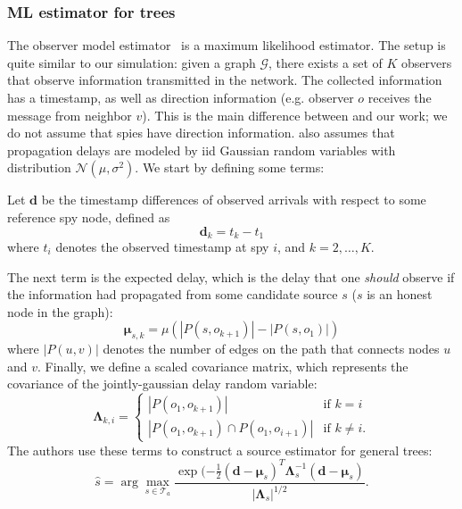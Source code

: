 \subsubsection{ML estimator for trees}
The observer model estimator~\cite{pinto} is a maximum likelihood estimator. The setup is quite similar to our simulation: given a graph $\mathcal G$, there exists a set of $K$ observers that observe information transmitted in the network. The collected information has a timestamp, as well as direction information (e.g. observer $o$ receives the message from neighbor $v$). This is the main difference between \cite{pinto} and our work; we do not assume that spies have direction information. \cite{pinto} also assumes that propagation delays are modeled by iid Gaussian random variables with distribution $\mathcal N(\mu,\sigma^2)$. We start by defining some terms:

Let $\boldsymbol{d}$ be the timestamp differences of observed arrivals with respect to some reference spy node, defined as
\begin{equation}
  \boldsymbol{d}_k = t_{k} - t_1
\end{equation}
where $t_i$ denotes the observed timestamp at spy $i$, and $k = 2,\ldots, K$.

The next term is the expected delay, which is the delay that one \emph{should} observe if the information had propagated from some candidate source $s$ ($s$ is an honest node in the graph):
\begin{equation}
  \boldsymbol{\mu}_{s,k} = \mu (|P(s, o_{k+1})| - |P(s, o_1)|)
\end{equation}
where $|P(u, v)|$ denotes the number of edges on the path that connects nodes $u$ and $v$. Finally, we define a scaled covariance matrix, which represents the covariance of the jointly-gaussian delay random variable:
\begin{equation}
  \boldsymbol{\Lambda}_{k, i} = \begin{cases}
    |P(o_1, o_{k+1})| & \text{if $k = i$} \\
    |P(o_1, o_{k+1}) \cap P(o_1, o_{i+1})| & \text{if $k \neq i$}.
  \end{cases}
\end{equation}
The authors use these terms to construct a source estimator for general trees:
\begin{equation}
\label{eq:general}
\hat{s} = \arg\max_{s \in \mathcal T_{a}} \dfrac{\exp(-\frac{1}{2} (\boldsymbol{d} - \boldsymbol{\mu}_{s})^{T} \boldsymbol{\Lambda}_s^{-1} (\boldsymbol{d} - \boldsymbol{\mu}_s) }{|\boldsymbol{\Lambda}_s|^{1/2}}.
\end{equation}

